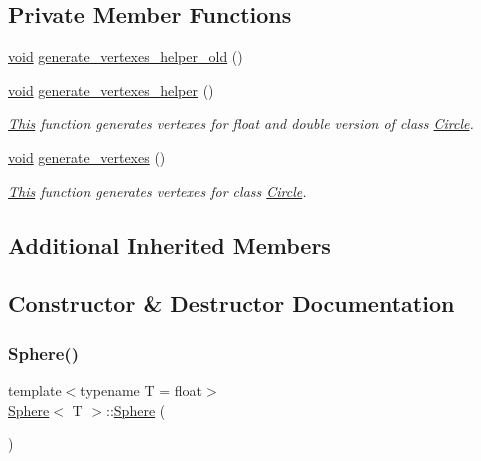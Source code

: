 \subsection*{Private Member Functions}
\begin{DoxyCompactItemize}
\item 
\mbox{\hyperlink{glad_8h_a950fc91edb4504f62f1c577bf4727c29}{void}} \mbox{\hyperlink{classSphere_ab739ad1931e58a4ba7c84e3ca5c1965d}{generate\+\_\+vertexes\+\_\+helper\+\_\+old}} ()
\item 
\mbox{\hyperlink{glad_8h_a950fc91edb4504f62f1c577bf4727c29}{void}} \mbox{\hyperlink{classSphere_a84a45f41ca9e630beb97fc106b359ffd}{generate\+\_\+vertexes\+\_\+helper}} ()
\begin{DoxyCompactList}\small\item\em \mbox{\hyperlink{classThis}{This}} function generates vertexes for float and double version of class \mbox{\hyperlink{classCircle}{Circle}}. \end{DoxyCompactList}\item 
\mbox{\hyperlink{glad_8h_a950fc91edb4504f62f1c577bf4727c29}{void}} \mbox{\hyperlink{classSphere_a9cfac85b9803fadc4b79db0ea047f679}{generate\+\_\+vertexes}} ()
\begin{DoxyCompactList}\small\item\em \mbox{\hyperlink{classThis}{This}} function generates vertexes for class \mbox{\hyperlink{classCircle}{Circle}}. \end{DoxyCompactList}\end{DoxyCompactItemize}
\subsection*{Additional Inherited Members}


\subsection{Constructor \& Destructor Documentation}
\mbox{\label{classSphere_acacfd6de079ea50acdaf57b823166651}} 
\subsubsection{\texorpdfstring{Sphere()}{Sphere()}\hspace{0.1cm}{\footnotesize\ttfamily [1/4]}}
{\footnotesize\ttfamily template$<$typename T = float$>$ \\
\mbox{\hyperlink{classSphere}{Sphere}}$<$ T $>$\+::\mbox{\hyperlink{classSphere}{Sphere}} (\begin{DoxyParamCaption}{ }\end{DoxyParamCaption})\hspace{0.3cm}{\ttfamily [inline]}}



